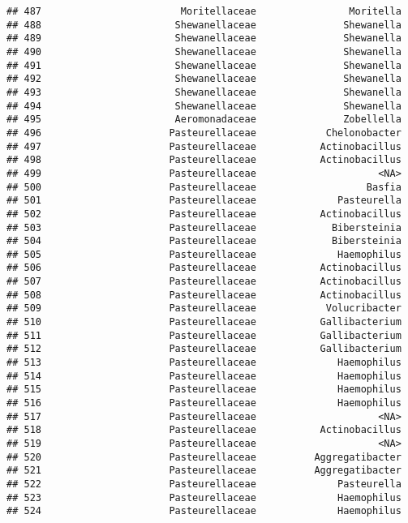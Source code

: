 \documentclass[
]{article}
\begin{document}
\begin{verbatim}
## 487                        Moritellaceae                Moritella
## 488                       Shewanellaceae               Shewanella
## 489                       Shewanellaceae               Shewanella
## 490                       Shewanellaceae               Shewanella
## 491                       Shewanellaceae               Shewanella
## 492                       Shewanellaceae               Shewanella
## 493                       Shewanellaceae               Shewanella
## 494                       Shewanellaceae               Shewanella
## 495                       Aeromonadaceae               Zobellella
## 496                      Pasteurellaceae            Chelonobacter
## 497                      Pasteurellaceae           Actinobacillus
## 498                      Pasteurellaceae           Actinobacillus
## 499                      Pasteurellaceae                     <NA>
## 500                      Pasteurellaceae                   Basfia
## 501                      Pasteurellaceae              Pasteurella
## 502                      Pasteurellaceae           Actinobacillus
## 503                      Pasteurellaceae             Bibersteinia
## 504                      Pasteurellaceae             Bibersteinia
## 505                      Pasteurellaceae              Haemophilus
## 506                      Pasteurellaceae           Actinobacillus
## 507                      Pasteurellaceae           Actinobacillus
## 508                      Pasteurellaceae           Actinobacillus
## 509                      Pasteurellaceae            Volucribacter
## 510                      Pasteurellaceae           Gallibacterium
## 511                      Pasteurellaceae           Gallibacterium
## 512                      Pasteurellaceae           Gallibacterium
## 513                      Pasteurellaceae              Haemophilus
## 514                      Pasteurellaceae              Haemophilus
## 515                      Pasteurellaceae              Haemophilus
## 516                      Pasteurellaceae              Haemophilus
## 517                      Pasteurellaceae                     <NA>
## 518                      Pasteurellaceae           Actinobacillus
## 519                      Pasteurellaceae                     <NA>
## 520                      Pasteurellaceae          Aggregatibacter
## 521                      Pasteurellaceae          Aggregatibacter
## 522                      Pasteurellaceae              Pasteurella
## 523                      Pasteurellaceae              Haemophilus
## 524                      Pasteurellaceae              Haemophilus

\end{verbatim}
\end{document}
